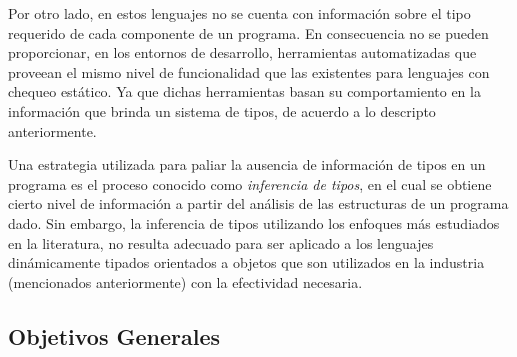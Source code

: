 \documentclass[a4paper,10pt]{article}
\begin{document}

Por otro lado, en estos lenguajes no se cuenta con información sobre el tipo requerido de cada componente de un programa. En consecuencia no se pueden proporcionar, en los entornos de desarrollo, herramientas automatizadas que proveean el mismo nivel de funcionalidad que las existentes para lenguajes con chequeo estático. Ya que dichas herramientas basan su comportamiento en la información que brinda un sistema de tipos, de acuerdo a lo descripto anteriormente.

%

Una estrategia utilizada para paliar la ausencia de información de tipos en un programa es el proceso conocido como \emph{inferencia de tipos}\cite{Miln78a}, en el cual se obtiene cierto nivel de información a partir del análisis de las estructuras de un programa dado.
Sin embargo, la inferencia de tipos utilizando los enfoques más estudiados en la literatura, no resulta adecuado\cite{Ages96a} para ser aplicado a los lenguajes dinámicamente tipados orientados a objetos que son utilizados en la industria (mencionados anteriormente) con la efectividad necesaria.



\subsection{Objetivos Generales}
\end{document}
